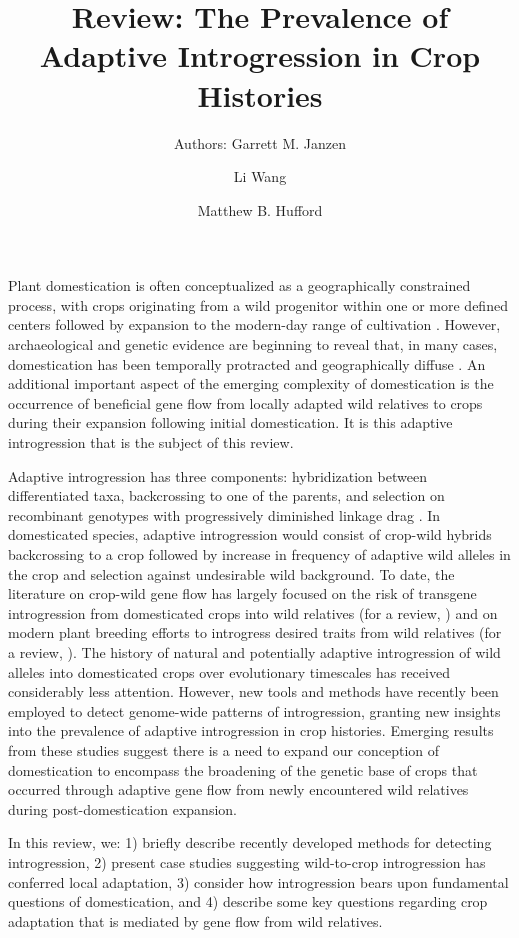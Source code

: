 \documentclass[11pt]{article}
\title{Review: The Prevalence of Adaptive Introgression in Crop Histories}
\author[1]{Authors: Garrett M. Janzen}%
\author[1]{Li Wang}
\author[1,*]{Matthew B. Hufford}
\affil[1]{Department of Ecology, Evolution, and Organismal Biology, Iowa State University, Ames, Iowa, USA}
\affil[*]{Correspondence: mhufford@iastate.edu (M.B. Hufford)}
\date{}
\begin{document}
\maketitle

Plant domestication is often conceptualized as a geographically constrained process, with crops originating from a wild progenitor within one or more defined centers followed by expansion to the modern-day range of cultivation \cite{Harlan1992}.
However, archaeological and genetic evidence are beginning to reveal that, in many cases, domestication has been temporally protracted and geographically diffuse \cite{brown2009complex, Meyer2016, wang2017, zhou2017, Fuller2014}.
An additional important aspect of the emerging complexity of domestication is the occurrence of beneficial gene flow from locally adapted wild relatives to crops during their expansion following initial domestication.
It is this adaptive introgression that is the subject of this review.

Adaptive introgression has three components: hybridization between differentiated taxa, backcrossing to one of the parents, and selection on recombinant genotypes with progressively diminished linkage drag \cite{barton2001role, Feuillet200824}.
In domesticated species, adaptive introgression would consist of crop-wild hybrids backcrossing to a crop followed by increase in frequency of adaptive wild alleles in the crop and selection against undesirable wild background.
To date, the literature on crop-wild gene flow has largely focused on the risk of transgene introgression from domesticated crops into wild relatives (for a review, \cite{stewart2003transgene}) and on modern plant breeding efforts to introgress desired traits from wild relatives (for a review, \cite{Dempewolf2017}).
The history of natural and potentially adaptive introgression of wild alleles into domesticated crops over evolutionary timescales has received considerably less attention.
However, new tools and methods have recently been employed to detect genome-wide patterns of introgression, granting new insights into the prevalence of adaptive introgression in crop histories.
Emerging results from these studies suggest there is a need to expand our conception of domestication to encompass the broadening of the genetic base of crops that occurred through adaptive gene flow from newly encountered wild relatives during post-domestication expansion.

In this review, we: 1) briefly describe recently developed methods for detecting introgression, 2) present case studies suggesting wild-to-crop introgression has conferred local adaptation, 3) consider how introgression bears upon fundamental questions of domestication, and 4) describe some key questions regarding crop adaptation that is mediated by gene flow from wild relatives.
\end{document}
